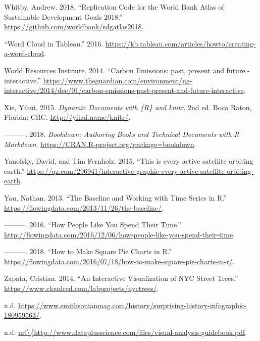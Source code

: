 \documentclass[]{book}
\begin{document}
\leavevmode\hypertarget{ref-worldbankcode}{}%
Whitby, Andrew. 2018. ``Replication Code for the World Bank Atlas of Sustainable Development Goals 2018.'' \url{https://github.com/worldbank/sdgatlas2018}.

\leavevmode\hypertarget{ref-Tableau_wordcloud}{}%
``Word Cloud in Tableau.'' 2016. \url{https://kb.tableau.com/articles/howto/creating-a-word-cloud}.

\leavevmode\hypertarget{ref-CO2_emission}{}%
World Resources Institute. 2014. ``Carbon Emissions: past, present and future - interactive.'' \url{https://www.theguardian.com/environment/ng-interactive/2014/dec/01/carbon-emissions-past-present-and-future-interactive}.

\leavevmode\hypertarget{ref-xie2015}{}%
Xie, Yihui. 2015. \emph{Dynamic Documents with \{R\} and knitr}. 2nd ed. Boca Raton, Florida: CRC. \url{http://yihui.name/knitr/}.

\leavevmode\hypertarget{ref-R-bookdown}{}%
---------. 2018. \emph{Bookdown: Authoring Books and Technical Documents with R Markdown}. \url{https://CRAN.R-project.org/package=bookdown}.

\leavevmode\hypertarget{ref-Satellite}{}%
Yanofsky, David, and Tim Fernholz. 2015. ``This is every active satellite orbiting earth.'' \url{https://qz.com/296941/interactive-graphic-every-active-satellite-orbiting-earth}.

\leavevmode\hypertarget{ref-baseline_2013}{}%
Yau, Nathan. 2013. ``The Baseline and Working with Time Series in R.'' \url{https://flowingdata.com/2013/11/26/the-baseline/}.

\leavevmode\hypertarget{ref-spendingtime}{}%
---------. 2016. ``How People Like You Spend Their Time.'' \url{http://flowingdata.com/2016/12/06/how-people-like-you-spend-their-time}.

\leavevmode\hypertarget{ref-Square_Pie_Charts}{}%
---------. 2018. ``How to Make Square Pie Charts in R.'' \url{https://flowingdata.com/2016/07/18/how-to-make-square-pie-charts-in-r/}.

\leavevmode\hypertarget{ref-trees}{}%
Zapata, Cristian. 2014. ``An Interactive Visualization of NYC Street Trees.'' \url{https://www.cloudred.com/labprojects/nyctrees/}.

\leavevmode\hypertarget{ref-history_dataviz}{}%
n.d. \url{https://www.smithsonianmag.com/history/surprising-history-infographic-180959563/}.

\leavevmode\hypertarget{ref-dataviz_bestprac}{}%
n.d. \href{url/\%7Bhttp://www.dataplusscience.com/files/visual-analysis-guidebook.pdf}{url\textbackslash{}\{http://www.dataplusscience.com/files/visual-analysis-guidebook.pdf}.
\end{document}
